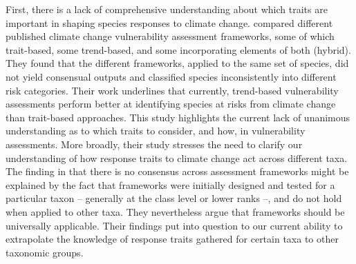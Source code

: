 First, there is a lack of comprehensive understanding about which traits are important in shaping species responses to climate change. \citet{Wheatley2017} compared different published climate change vulnerability assessment frameworks, some of which trait-based, some trend-based, and some incorporating elements of both (hybrid). They found that the different frameworks, applied to the same set of species, did not yield consensual outputs and classified species inconsistently into different risk categories. Their work underlines that currently, trend-based vulnerability assessments perform better at identifying species at risks from climate change than trait-based approaches. This study highlights the current lack of unanimous understanding as to which traits to consider, and how, in vulnerability assessments. More broadly, their study stresses the need to clarify our understanding of how response traits to climate change act across different taxa. The finding in \citet{Wheatley2017} that there is no consensus across assessment frameworks might be explained by the fact that frameworks were initially designed and tested for a particular taxon – generally at the class level or lower ranks –, and do not hold when applied to other taxa. They nevertheless argue that frameworks should be universally applicable. Their findings put into question to our current ability to extrapolate the knowledge of response traits gathered for certain taxa to other taxonomic groups. 


